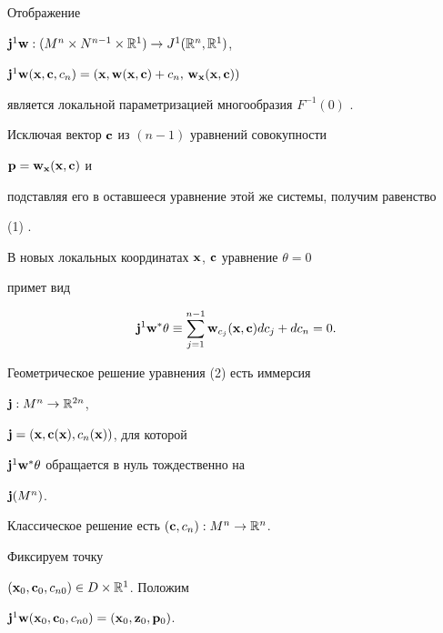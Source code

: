 Отображение


$\bold j^1\bold w:(M^n\times N^{n-1}\times\Bbb R^1)


\to J^1(\Bbb R^n,\Bbb R^1)$,


$\bold j^1\bold w(\bold x,\bold c,c_n)=(\bold x,\bold w(\bold x,


\bold c)+c_n,\,\bold w_{\bold x}(\bold x,\bold c))$


является локальной параметризацией многообразия $F^{-1}(0)$ \cite{R1}.


Исключая вектор $\bold c$ из $(n-1)$ уравнений совокупности


$\bold p=\bold w_{\bold x}(\bold x,\bold c)$ и


подставляя его в оставшееся уравнение этой же системы, получим равенство


(1) \cite{G2}.





В новых локальных координатах $\bold x$, $\bold c$ уравнение $\theta=0$


примет вид


\begin{equation}


\bold j^1\bold w^*\theta\equiv\sum^{n-1}_{j=1}


\bold w_{c_j}(\bold x,\bold c)dc_j+dc_n=0.


\end{equation}





Геометрическое решение уравнения (2) есть иммерсия


$\bold j:M^n\to\Bbb R^{2n}$,


$\bold j=(\bold x,\bold c(\bold x),c_n(\bold x))$, для которой


$\bold j^1\bold w^*\theta$ обращается в нуль тождественно на


$\bold j(M^n)$.


Классическое решение есть $(\bold c,c_n):M^n\to\Bbb R^n$.





Фиксируем точку


$(\bold x_0,\bold c_0,c_{n0})\in D\times\Bbb R^1$. Положим


$\bold j^1\bold w(\bold x_0,\bold c_0,c_{n0})=


(\bold x_0,\bold z_0,\bold p_0)$.





